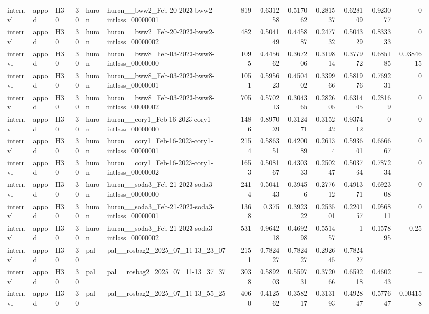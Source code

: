 \begin{longtable}{lllrllrrrrrrr}
internvl & appod & H30 & 30 & huron & huron\_\_bww2\_Feb-20-2023-bww2-intloss\_00000001 & 819 & 0.631258 & 0.517062 & 0.281537 & 0.628109 & 0.923077 & 0 \\
internvl & appod & H30 & 30 & huron & huron\_\_bww2\_Feb-20-2023-bww2-intloss\_00000002 & 482 & 0.504149 & 0.445887 & 0.247732 & 0.504329 & 0.833333 & 0 \\
internvl & appod & H30 & 30 & huron & huron\_\_bww8\_Feb-03-2023-bww8-intloss\_00000000 & 1095 & 0.445662 & 0.367206 & 0.319814 & 0.377972 & 0.685185 & 0.0384615 \\
internvl & appod & H30 & 30 & huron & huron\_\_bww8\_Feb-03-2023-bww8-intloss\_00000001 & 1051 & 0.595623 & 0.450402 & 0.339966 & 0.581976 & 0.769231 & 0 \\
internvl & appod & H30 & 30 & huron & huron\_\_bww8\_Feb-03-2023-bww8-intloss\_00000002 & 705 & 0.570213 & 0.304365 & 0.282605 & 0.631405 & 0.28169 & 0 \\
internvl & appod & H30 & 30 & huron & huron\_\_cory1\_Feb-16-2023-cory1-intloss\_00000000 & 1486 & 0.897039 & 0.312471 & 0.315242 & 0.937412 & 0 & 0 \\
internvl & appod & H30 & 30 & huron & huron\_\_cory1\_Feb-16-2023-cory1-intloss\_00000001 & 2154 & 0.586351 & 0.420089 & 0.26134 & 0.593601 & 0.666667 & 0 \\
internvl & appod & H30 & 30 & huron & huron\_\_cory1\_Feb-16-2023-cory1-intloss\_00000002 & 1653 & 0.508167 & 0.430333 & 0.250247 & 0.503764 & 0.787234 & 0 \\
internvl & appod & H30 & 30 & huron & huron\_\_soda3\_Feb-21-2023-soda3-intloss\_00000000 & 2414 & 0.504143 & 0.39456 & 0.277612 & 0.491371 & 0.692308 & 0 \\
internvl & appod & H30 & 30 & huron & huron\_\_soda3\_Feb-21-2023-soda3-intloss\_00000001 & 1368 & 0.375 & 0.392322 & 0.253501 & 0.220157 & 0.956811 & 0 \\
internvl & appod & H30 & 30 & huron & huron\_\_soda3\_Feb-21-2023-soda3-intloss\_00000002 & 531 & 0.964218 & 0.469298 & 0.551457 & 1 & 0.157895 & 0.25 \\
internvl & appod & H30 & 30 & pal & pal\_\_rosbag2\_2025\_07\_11-13\_23\_07 & 2151 & 0.782427 & 0.782427 & 0.292645 & 0.782427 & -- & -- \\
internvl & appod & H30 & 30 & pal & pal\_\_rosbag2\_2025\_07\_11-13\_37\_37 & 3038 & 0.589203 & 0.559731 & 0.372066 & 0.659218 & 0.460243 & -- \\
internvl & appod & H30 & 30 & pal & pal\_\_rosbag2\_2025\_07\_11-13\_55\_25 & 4060 & 0.412562 & 0.358217 & 0.313193 & 0.492847 & 0.577647 & 0.004158 \\

\end{longtable}
